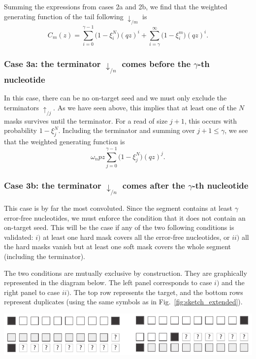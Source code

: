 \documentclass{article}
\newenvironment{inset}
{\vspace{0.5\baselineskip}\begin{center}}
{\end{center}\vspace{0.5\baselineskip}}
\begin{document}
Summing the expressions from cases 2a and 2b, we find that the
weighted generating function of the tail following $\downarrow_{/m}$ is
\begin{equation}
\label{eq:C}
C_m(z) =
\sum_{i=0}^{\gamma-1} \Big(1 - \xi_i^N \Big) (qz)^i +
  \sum_{i=\gamma}^\infty \Big(1 - \xi_i^m \Big) (qz)^i.
\end{equation}

\subsubsection*{Case 3a: the terminator $\downarrow_{/n}$ comes before the
$\gamma$-th nucleotide}

In this case, there can be no on-target seed and we must only exclude the
terminators $\uparrow_{/j}$. As we have seen above, this implies that at
least one of the $N$ masks survives until the terminator. For a read of
size $j+1$, this occurs with probability $1-\xi_j^N$. Including the
terminator and summing over $j+1 \leq \gamma$, we see that the weighted
generating function is
\begin{equation}
\omega_n pz \sum_{j=0}^{\gamma-1} \Big(1 - \xi_j^N \Big) (qz)^j.
\end{equation}

\subsubsection*{Case 3b: the terminator $\downarrow_{/n}$ comes after the
$\gamma$-th nucleotide}

This case is by far the most convoluted. Since the segment contains at
least $\gamma$ error-free nucleotides, we must enforce the condition that
it does not contain an on-target seed. This will be the case if any of the
two following conditions is validated: $i)$ at least one hard mask covers
all the error-free nucleotides, or $ii)$ all the hard masks vanish but at
least one soft mask covers the whole segment (including the terminator).

The two conditions are mutually exclusive by construction. They are
graphically represented in the diagram below. The left panel corresponds
to case $i)$ and the right panel to case $ii)$. The top row represents the
target, and the bottom rows represent duplicates (using the same symbols
as in Fig.~\ref{fig:sketch_extended}).
\begin{inset}
\includegraphics{masks.pdf}
\end{inset}
\end{document}
